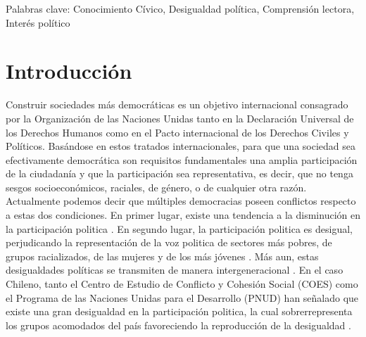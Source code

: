 \documentclass[12pt,twoside]{templates/facsothesis}
\begin{document}
Palabras clave: Conocimiento Cívico, Desigualdad política, Comprensión lectora, Interés político

\hypertarget{introducciuxf3n}{%
\chapter{Introducción}\label{introducciuxf3n}}

Construir sociedades más democráticas es un objetivo internacional consagrado por la Organización de las Naciones Unidas tanto en la Declaración Universal de los Derechos Humanos como en el Pacto internacional de los Derechos Civiles y Políticos. Basándose en estos tratados internacionales, para que una sociedad sea efectivamente democrática son requisitos fundamentales una amplia participación de la ciudadanía y que la participación sea representativa, es decir, que no tenga sesgos socioeconómicos, raciales, de género, o de cualquier otra razón. Actualmente podemos decir que múltiples democracias poseen conflictos respecto a estas dos condiciones. En primer lugar, existe una tendencia a la disminución en la participación politica \citep{tezanos-pintoParticipacionPoliticaDescontento2015, herrmannDisminucionParticipacionPoblacion2016, diazDimensionesTendenciasParticipacion2017, janmaatCivicCompetences2013, contrerasDIFERENCIASGENERACIONALESPARTICIPACION2013, galstonCivicKnowledgeCivic2007}. En segundo lugar, la participación politica es desigual, perjudicando la representación de la voz politica de sectores más pobres, de grupos racializados, de las mujeres y de los más jóvenes \citep{verbaWouldDreamPolitical2003, lijphartUnequalParticipationDemocracy1997, desposatoGenderGapLatin2009, coffeExplainingGenderDifferences2020, hutchingsCENTRALITYRACEAMERICAN2004}. Más aun, estas desigualdades políticas se transmiten de manera intergeneracional \citep{bradyPoliticalMobilityPolitical2015}. En el caso Chileno, tanto el Centro de Estudio de Conflicto y Cohesión Social (COES) como el Programa de las Naciones Unidas para el Desarrollo (PNUD) han señalado que existe una gran desigualdad en la participación politica, la cual sobrerrepresenta los grupos acomodados del país favoreciendo la reproducción de la desigualdad \citep{joignantDesigualdadesVozPolitica2017, paletDesigualesOrigenesCambios2017}.
\end{document}
